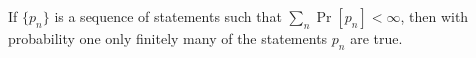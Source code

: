 If $\{p_n\}$ is a sequence of statements such that $\sum_n \Pr[p_n] < \infty$, then with probability one only finitely many of the statements $p_n$ are true.